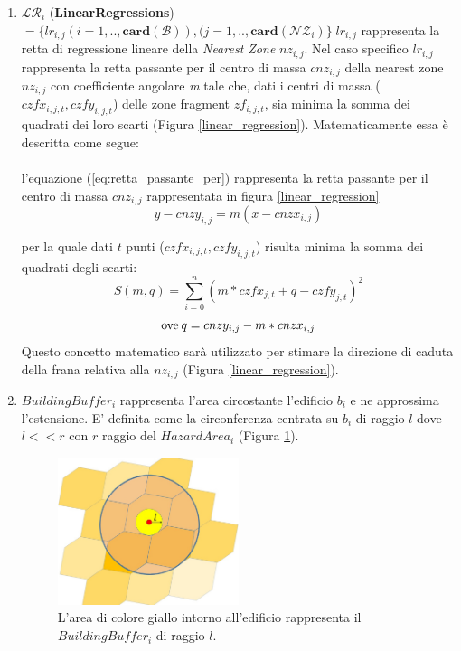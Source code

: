 \begin{enumerate}
	\item \textbf{$ \mathcal{LR}_i $} (\textbf{LinearRegressions}) $ = \{lr_{i,j}(i=1,..,\mathbf{card}(\mathcal{B})),(j=1,..,\mathbf{card}(\mathcal{NZ}_i)\} | lr_{i,j} $ rappresenta la retta di regressione lineare della \textit{Nearest Zone} $nz_{i,j}$. Nel caso specifico $lr_{i,j} $ rappresenta la retta passante per il centro di massa $cnz_{i,j}$ della nearest zone $nz_{i,j}$ con coefficiente angolare \textit{m} tale che, dati i centri di massa ($czfx_{i,j,t}, czfy_{i,j,t}$)  delle zone fragment $zf_{i,j,t}$,  sia minima la somma dei quadrati dei loro scarti (Figura \ref{linear_regression}). Matematicamente essa è descritta come segue:\\
	\\
	l'equazione (\ref{eq:retta_passante_per}) rappresenta la retta passante per il centro di massa $cnz_{i,j}$ rappresentata in figura \ref{linear_regression}
	\begin{equation}\label{eq:retta_passante_per}
		y - cnzy_{i,j} = m(x-cnzx_{i,j})
	\end{equation}
	
	per la quale dati $t$ punti ($czfx_{i,j,t}, czfy_{i,j,t}$) risulta minima la somma dei quadrati degli scarti:
	\begin{equation}\label{eq:somma_degli_scarti}
		S(m, q) = \sum_{i=0}^n (m*czfx_{j,t} + q - czfy_{j,t})^2 
	\end{equation}
	\begin{equation}
		\textnormal{ove}\: q = cnzy_{i,j} - m*cnzx_{i,j}
	\end{equation}
	Questo concetto matematico sarà utilizzato per stimare la direzione di caduta della frana relativa alla $nz_{i,j}$ (Figura \ref{linear_regression}).
		
	\newpage
	\item \textit{$BuildingBuffer_i$} rappresenta l'area circostante l'edificio $b_i$ e ne approssima l'estensione. E' definita come la circonferenza centrata su $b_i$ di raggio $l$ dove $l<<r $ con $r$ raggio del \textit{$HazardArea_i$} (Figura \ref{buildingimpactfactor}).
	
	\begin{figure}[h]
		\centering
		\includegraphics[width=0.5\textwidth]{images/buildingimpactfactor}
		\caption{L'area di colore giallo intorno all'edificio rappresenta il $BuildingBuffer_i$ di raggio $l$.}
		\label{buildingimpactfactor}
	\end{figure}
	

\end{enumerate}
